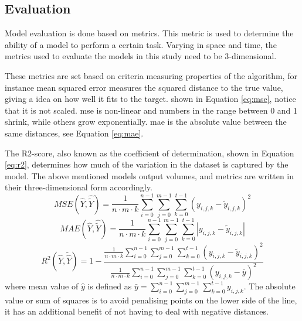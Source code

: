 \subsection{Evaluation} \label{sec:evaluation}
Model evaluation is done based on metrics. This metric is used to determine the ability of a model to perform a certain task. Varying in space and time, the metrics used to evaluate the models in this study need to be 3-dimensional.

These metrics are set based on criteria measuring properties of the algorithm, for instance mean squared error measures the squared distance to the true value, giving a idea on how well it fits to the target. shown in Equation \eqref{eq:mse}, notice that it is not scaled. \acrshort{mse} is non-linear and numbers in the range between 0 and 1 shrink, while others grow exponentially.  \acrfull{mae} is the absolute value between the same distances, see Equation \eqref{eq:mae}. 

The R2-score, also known as the coefficient of determination, shown in Equation \eqref{eq:r2},  determines how much of the variation in the dataset is captured by the model. The above mentioned models output volumes, and metrics are written in their three-dimensional form accordingly.
\begin{equation} \label{eq:mse}
    MSE(\hat{Y},\hat{\tilde{Y}}) = \frac{1}{n\cdot m \cdot k} \sum_{i=0}^{n-1}\sum_{j=0}^{m-1}\sum_{k=0}^{t-1}(y_{i, j, k}-\tilde{y}_{i, j, k})^2
\end{equation} 
\begin{equation} \label{eq:mae}
    MAE(\hat{Y},\hat{\tilde{Y}}) = \frac{1}{n\cdot m \cdot k} \sum_{i=0}^{n-1}\sum_{j=0}^{m-1}\sum_{k=0}^{t-1}\left|y_{i, j, k}-\tilde{y}_{i, j, k}\right|
\end{equation} 
\begin{equation} \label{eq:r2}
    R^2(\hat{Y}, \tilde{\hat{Y}}) = 1 - \frac{\frac{1}{n\cdot m \cdot k} \sum_{i=0}^{n-1}\sum_{j=0}^{m-1}\sum_{k=0}^{t-1}(y_{i, j, k}-\tilde{y}_{i, j, k})^2}{\frac{1}{n\cdot m \cdot k} \sum_{i=0}^{n-1}\sum_{j=0}^{m-1}\sum_{k=0}^{t-1}(y_{i, j, k}-\bar{y})^2}
\end{equation} 
where mean value of $\hat{y}$ is defined as $\bar{y} =   \sum_{i=0}^{n-1}\sum_{j=0}^{m-1}\sum_{k=0}^{t-1}y_{i, j, k}$. 
The absolute value or sum of squares is to avoid penalising points on the lower side of the line, it has an additional benefit of not having to deal with negative distances. 

